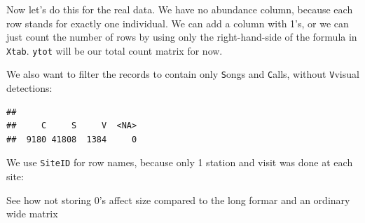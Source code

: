 \documentclass[12pt,]{scrbook}
\newenvironment{Shaded}{\begin{snugshade}}{\end{snugshade}}
\newcommand{\CommentTok}[1]{\textcolor[rgb]{0.56,0.35,0.01}{\textit{#1}}}
\newcommand{\DataTypeTok}[1]{\textcolor[rgb]{0.13,0.29,0.53}{#1}}
\newcommand{\KeywordTok}[1]{\textcolor[rgb]{0.13,0.29,0.53}{\textbf{#1}}}
\newcommand{\NormalTok}[1]{#1}
\newcommand{\OperatorTok}[1]{\textcolor[rgb]{0.81,0.36,0.00}{\textbf{#1}}}
\newcommand{\StringTok}[1]{\textcolor[rgb]{0.31,0.60,0.02}{#1}}
\begin{document}
Now let's do this for the real data. We have no abundance column, because
each row stands for exactly one individual. We can add a column with 1's,
or we can just count the number of rows by using only the right-hand-side of the
formula in \texttt{Xtab}. \texttt{ytot} will be our total count matrix for now.

We also want to filter the records to contain only \texttt{S}ongs and \texttt{C}alls, without
\texttt{V}visual detections:

\begin{Shaded}
\end{Shaded}

\begin{verbatim}
## 
##     C     S     V  <NA> 
##  9180 41808  1384     0
\end{verbatim}

We use \texttt{SiteID} for row names, because only 1 station and visit was done at each site:

\begin{Shaded}
\end{Shaded}

See how not storing 0's affect size compared to the long formar and an ordinary wide matrix

\begin{Shaded}
\end{Shaded}
\end{document}
